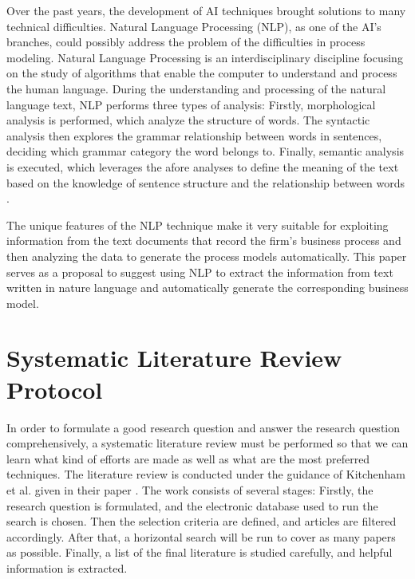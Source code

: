 \documentclass[runningheads]{llncs}
\begin{document}
	Over the past years, the development of AI techniques brought solutions to many technical difficulties. Natural Language Processing (NLP), as one of the AI's branches, could possibly address the problem of the difficulties in process modeling. Natural Language Processing is an interdisciplinary discipline focusing on the study of algorithms that enable the computer to understand and process the human language\cite{main_1}. During the understanding and processing of the natural language text, NLP performs three types of analysis: Firstly, morphological analysis is performed, which analyze the structure of words. The syntactic analysis then explores the grammar relationship between words in sentences, deciding which grammar category the word belongs to. Finally, semantic analysis is executed, which leverages the afore analyses to define the meaning of the text based on the knowledge of sentence structure and the relationship between words \cite{literature_review_2}. 
	
	The unique features of the NLP technique make it very suitable for exploiting information from the text documents that record the firm's business process and then analyzing the data to generate the process models automatically. This paper serves as a proposal to suggest using NLP to extract the information from text written in nature language and automatically generate the corresponding business model.
	
		
	\section{Systematic Literature Review Protocol}
	In order to formulate a good research question and answer the research question comprehensively, a systematic literature review must be performed so that we can learn what kind of efforts are made as well as what are the most preferred techniques. The literature review is conducted under the guidance of Kitchenham et al. given in their paper \cite{literature_review_guidance}. The work consists of several stages: Firstly, the research question is formulated, and the electronic database used to run the search is chosen. Then the selection criteria are defined, and articles are filtered accordingly. After that, a horizontal search will be run to cover as many papers as possible. Finally, a list of the final literature is studied carefully, and helpful information is extracted.
	
\end{document}
